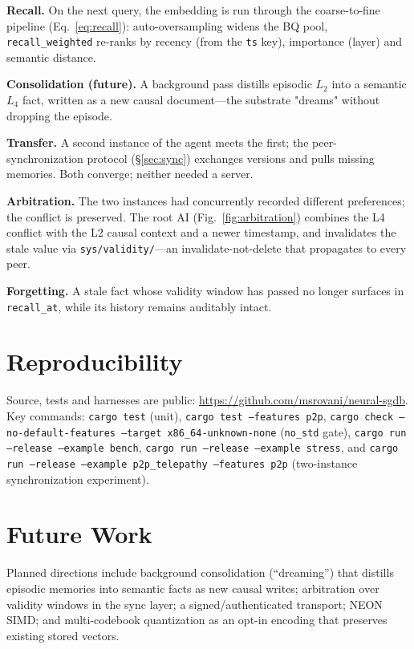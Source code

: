 \documentclass[11pt,twocolumn]{article}
\begin{document}
\textbf{Recall.} On the next query, the embedding is run through the
coarse-to-fine pipeline (Eq.~\ref{eq:recall}): auto-oversampling widens the BQ
pool, \texttt{recall\_weighted} re-ranks by recency (from the \texttt{ts} key),
importance (layer) and semantic distance.

\textbf{Consolidation (future).} A background pass distills episodic $L_2$ into
a semantic $L_4$ fact, written as a new causal document---the substrate
"dreams" without dropping the episode.

\textbf{Transfer.} A second instance of the agent meets the first; the
peer-synchronization protocol (\S\ref{sec:sync}) exchanges versions and pulls
missing memories. Both converge; neither needed a server.

\textbf{Arbitration.} The two instances had concurrently recorded different
preferences; the conflict is preserved. The root AI (Fig.~\ref{fig:arbitration})
combines the L4 conflict with the L2 causal context and a newer timestamp,
and invalidates the stale value via \texttt{sys/validity/}---an
invalidate-not-delete that propagates to every peer.

\textbf{Forgetting.} A stale fact whose validity window has passed no longer
surfaces in \texttt{recall\_at}, while its history remains auditably intact.

\section{Reproducibility}
\label{sec:repro}

Source, tests and harnesses are public:
\url{https://github.com/msrovani/neural-sgdb}. Key commands:
\texttt{cargo test} (unit), \texttt{cargo test --features p2p},
\texttt{cargo check --no-default-features --target x86\_64-unknown-none}
(\texttt{no\_std} gate), \texttt{cargo run --release --example bench},
\texttt{cargo run --release --example stress}, and \texttt{cargo run --release
--example p2p\_telepathy --features p2p} (two-instance synchronization
experiment).

\section{Future Work}
\label{sec:future}

Planned directions include background consolidation (``dreaming'') that
distills episodic memories into semantic facts as new causal writes;
arbitration over validity windows in the sync layer; a signed/authenticated
transport; NEON SIMD; and multi-codebook quantization as an opt-in encoding
that preserves existing stored vectors.
\end{document}
